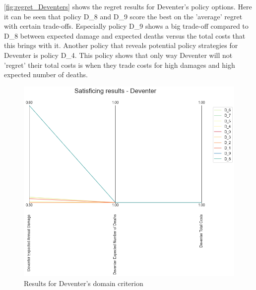 \noindent \autoref{fig:regret_Deventers} shows the regret results for Deventer's policy options. Here it can be seen that policy D\_8 and D\_9 score the best on the 'average' regret with certain trade-offs. Especially policy D\_9 shows a big trade-off compared to D\_8 between expected damage and expected deaths versus the total costs that this brings with it. Another policy that reveals potential policy strategies for Deventer is policy D\_4. This policy shows that only way Deventer will not 'regret' their total costs is when they trade costs for high damages and high expected number of deaths. 
\begin{figure}[H]
  \centering
  \begin{minipage}[b]{0.4\textwidth}
    \includegraphics[width=1.2\textwidth]{report/figures/results/domain_criterion_Deventer.png}
    \caption{Results for Deventer's domain criterion}
    \label{fig:domain_criterion_Deventers}
  \end{minipage}
  \hfill
  \begin{minipage}[b]{0.4\textwidth}

\end{minipage}
\end{figure}
